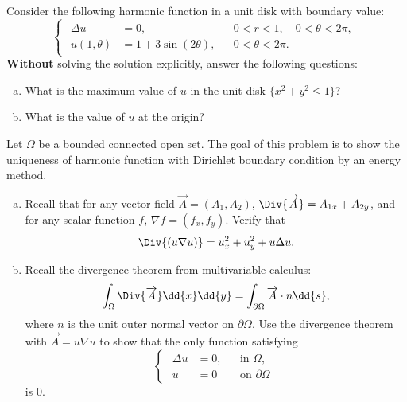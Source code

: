\documentclass[plain]{pset}
\begin{document}
\pagebreak

\begin{problem}
    Consider the following harmonic function in a unit disk with boundary value:
    \[
        \begin{cases}
            \begin{aligned}
                \Delta u     & = 0, &  & 0 < r < 1, \quad 0 < \theta < 2\pi, \\
                u(1, \theta) & = 1 + 3\sin(2\theta), &  & 0 < \theta < 2\pi.
            \end{aligned}
        \end{cases}
    \]
    \textbf{Without} solving the solution explicitly, answer the following questions:
    \begin{enumerate}[(a)]
        \item What is the maximum value of \(u\) in the unit disk \(\{x^2 + y^2 \leq 1\}\)?
        \item What is the value of \(u\) at the origin?
    \end{enumerate}
\end{problem}
\begin{solution}

\end{solution}

\pagebreak

\begin{problem}
    Let \(\Omega\) be a bounded connected open set. The goal of this problem is to show the uniqueness of harmonic function with Dirichlet boundary condition by an energy method.
    \begin{enumerate}[(a)]
        \item Recall that for any vector field \(\overrightarrow{A} = (A_1, A_2)\), \(\Div{\overrightarrow{A}} = A_{1x} + A_{2y}\), and for any scalar function \(f\), \(\nabla f = (f_x, f_y)\). Verify that
        \[
            \Div{(u\nabla u)} = u_x^2 + u_y^2 + u\Delta u.
        \]
        \item Recall the divergence theorem from multivariable calculus:
        \[\int_\Omega \Div{\overrightarrow{A}} \dd{x} \dd{y} = \int_{\partial \Omega} \overrightarrow{A} \cdot n \dd{s},\]
        where \(n\) is the unit outer normal vector on \(\partial \Omega\). Use the divergence theorem with \(\overrightarrow{A} = u\nabla u\) to show that the only function satisfying
        \[
            \begin{cases}
                \begin{aligned}
                    \Delta u & = 0, &  & \text{in } \Omega, \\
                    u        & = 0 &  & \text{on } \partial \Omega
                \end{aligned}
            \end{cases}
        \]
        is \(0\).
        \end{enumerate}
\end{problem}
\begin{solution}

\end{solution}
\end{document}
